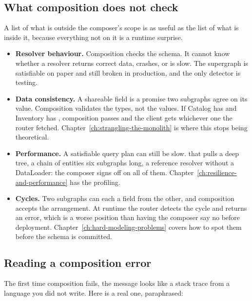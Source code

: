 \subsection*{What composition does not check}

%
A list of what is outside the composer's scope is as useful as the list of what
is inside it, because everything not on it is a runtime surprise.

\begin{itemize}
\item \textbf{Resolver behaviour.} Composition checks the schema. It cannot know
  whether a resolver returns correct data, crashes, or is slow. The supergraph
  is satisfiable on paper and still broken in production, and the only
  detector is testing.

\item \textbf{Data consistency.} A shareable field is a promise two subgraphs
  agree on its value. Composition validates the types, not the values. If
  Catalog has  and Inventory has ,
  composition passes and the client gets whichever one the router fetched.
  Chapter~\ref{ch:strangling-the-monolith} is where this stops being
  theoretical.

\item \textbf{Performance.} A satisfiable query plan can still be slow.
   that pulls a deep tree, a chain of entities six subgraphs
  long, a reference resolver without a DataLoader: the composer signs off
  on all of them. Chapter~\ref{ch:resilience-and-performance} has the
  profiling.

\item \textbf{Cycles.} Two subgraphs can each  a field from the
  other, and composition accepts the arrangement. At runtime the router detects
  the cycle and returns an error, which is a worse position than having the
  composer say no before deployment. Chapter~\ref{ch:hard-modeling-problems}
  covers how to spot them before the schema is committed.
\end{itemize}

\subsection*{Reading a composition error}

%
The first time composition fails, the message looks like a stack trace from a
language you did not write. Here is a real one, paraphrased:

